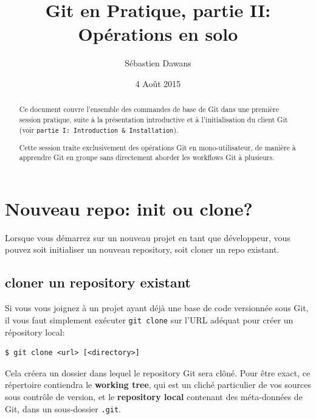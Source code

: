 \documentclass{../../common/tufte-latex/tufte-handout}
\title{Git en Pratique, partie II: Op\'erations en solo}
\author{S\'ebastien Dawans}
\date{4 Ao\^ut 2015} %
\begin{document}
\maketitle%

\begin{abstract}
\noindent
Ce document couvre l'ensemble des commandes de base de Git dans une première session pratique, suite à la présentation introductive et à l'initialisation du client Git (voir \texttt{partie I: Introduction \& Installation}).

Cette session traite exclusivement des opérations Git en mono-utilisateur, de manière à apprendre Git en groupe sans directement aborder les workflows Git à plusieurs.
\end{abstract}

\section{Nouveau repo: init ou clone?}

Lorsque vous démarrez sur un nouveau projet en tant que développeur, vous pouvez soit initialiser un nouveau repository, soit cloner un repo existant.

\subsection{cloner un repository existant}

Si vous vous joignez à un projet ayant déjà une base de code versionnée sous Git, il vous faut simplement exécuter \texttt{git clone} sur l'URL adéquat pour créer un répository local: 

\begin{lstlisting}[style=BashInputStyle]
  $ git clone <url> [<directory>]
\end{lstlisting}

Cela créera un dossier dans lequel le repository Git sera clôné.
Pour être exact, ce répertoire contiendra le \textbf{working tree}, qui est un cliché particulier de vos sources sous contrôle de version, et le \textbf{repository local} contenant des méta-données de Git, dans un sous-dossier \texttt{.git}.
\end{document}
